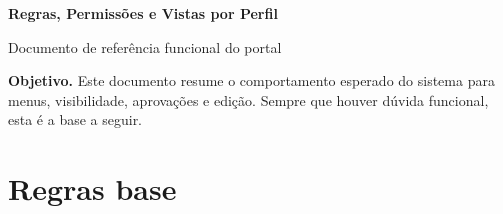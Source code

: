 \documentclass[11pt,a4paper]{article}
\begin{document}
\begin{center}
  {\LARGE\bfseries\color{titleblue} Regras, Permissões e Vistas por Perfil}

  \vspace{0.4em}
  {\normalsize Documento de referência funcional do portal}
\end{center}

\vspace{0.5em}
\noindent\colorbox{softblue}{\parbox{\dimexpr\linewidth-2\fboxsep\relax}{
\textbf{Objetivo.} Este documento resume o comportamento esperado do sistema para menus, visibilidade, aprovações e edição. Sempre que houver dúvida funcional, esta é a base a seguir.
}}

\section{Regras base}
\end{document}
